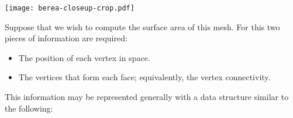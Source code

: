 {\centering
\texttt{[image: berea-closeup-crop.pdf]}
}


Suppose that we wish to compute the surface area of this mesh. For this two pieces of information are required:
\begin{itemize}
\item The position of each vertex in space.
\item The vertices that form each face; equivalently, the vertex connectivity.
\end{itemize}

This information may be represented generally with a data structure similar to the following:
%

